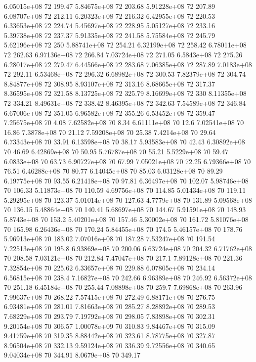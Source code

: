 6.05015e+08 72 199.47
5.84675e+08 72 203.68
5.91228e+08 72 207.89
6.08707e+08 72 212.11
6.20323e+08 72 216.32
6.42955e+08 72 220.53
6.33653e+08 72 224.74
5.45697e+08 72 228.95
5.05127e+08 72 233.16
5.39738e+08 72 237.37
5.91335e+08 72 241.58
5.75584e+08 72 245.79
5.62196e+08 72 250
5.88741e+08 72 254.21
6.32199e+08 72 258.42
6.78011e+08 72 262.63
6.97136e+08 72 266.84
7.03724e+08 72 271.05
6.5843e+08 72 275.26
6.28017e+08 72 279.47
6.44566e+08 72 283.68
7.06385e+08 72 287.89
7.0183e+08 72 292.11
6.53468e+08 72 296.32
6.68982e+08 72 300.53
7.82379e+08 72 304.74
8.84877e+08 72 308.95
8.93107e+08 72 313.16
8.68665e+08 72 317.37
8.36595e+08 72 321.58
8.13725e+08 72 325.79
8.16699e+08 72 330
8.11355e+08 72 334.21
8.49631e+08 72 338.42
8.46395e+08 72 342.63
7.54589e+08 72 346.84
6.67006e+08 72 351.05
6.96582e+08 72 355.26
6.53452e+08 72 359.47
7.25675e+08 70 4.08
7.62582e+08 70 8.34
6.61111e+08 70 12.6
7.02541e+08 70 16.86
7.3878e+08 70 21.12
7.59208e+08 70 25.38
7.4214e+08 70 29.64
6.73343e+08 70 33.91
6.13598e+08 70 38.17
5.93583e+08 70 42.43
6.30892e+08 70 46.69
6.42869e+08 70 50.95
5.76787e+08 70 55.21
5.5229e+08 70 59.47
6.0833e+08 70 63.73
6.90727e+08 70 67.99
7.05021e+08 70 72.25
6.79366e+08 70 76.51
6.46288e+08 70 80.77
6.14045e+08 70 85.03
6.03128e+08 70 89.29
6.19775e+08 70 93.55
6.21418e+08 70 97.81
6.36497e+08 70 102.07
5.98746e+08 70 106.33
5.11873e+08 70 110.59
4.69756e+08 70 114.85
5.01434e+08 70 119.11
5.29295e+08 70 123.37
5.01014e+08 70 127.63
4.7779e+08 70 131.89
5.09568e+08 70 136.15
5.48864e+08 70 140.41
5.68697e+08 70 144.67
5.91591e+08 70 148.93
5.8743e+08 70 153.2
5.40201e+08 70 157.46
5.30002e+08 70 161.72
5.81076e+08 70 165.98
6.26436e+08 70 170.24
5.84455e+08 70 174.5
5.46157e+08 70 178.76
5.96913e+08 70 183.02
7.07016e+08 70 187.28
7.53247e+08 70 191.54
7.22513e+08 70 195.8
6.93869e+08 70 200.06
6.63724e+08 70 204.32
6.71762e+08 70 208.58
7.03121e+08 70 212.84
7.47047e+08 70 217.1
7.89128e+08 70 221.36
7.32854e+08 70 225.62
6.33657e+08 70 229.88
6.07805e+08 70 234.14
6.56815e+08 70 238.4
7.16827e+08 70 242.66
6.96389e+08 70 246.92
6.56372e+08 70 251.18
6.45184e+08 70 255.44
7.08898e+08 70 259.7
7.69868e+08 70 263.96
7.99637e+08 70 268.22
7.57415e+08 70 272.49
6.88171e+08 70 276.75
6.93481e+08 70 281.01
7.81663e+08 70 285.27
8.28892e+08 70 289.53
7.68229e+08 70 293.79
7.19792e+08 70 298.05
7.83898e+08 70 302.31
9.20154e+08 70 306.57
1.00078e+09 70 310.83
9.84467e+08 70 315.09
9.41759e+08 70 319.35
8.88442e+08 70 323.61
8.78775e+08 70 327.87
8.96504e+08 70 332.13
9.59124e+08 70 336.39
9.72556e+08 70 340.65
9.04034e+08 70 344.91
8.0679e+08 70 349.17
